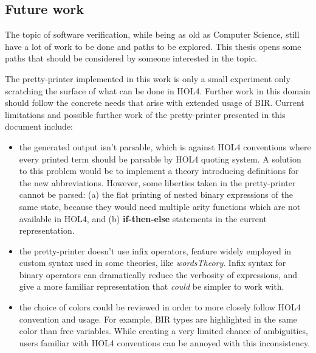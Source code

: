 \documentclass[10pt,a4paper]{article}
\begin{document}
\begin{multicols}{2}
\subsection{Future work}

The topic of software verification, while being as old as Computer Science, still have a lot of work to be done and paths to be explored. This thesis opens some paths that should be considered by someone interested in the topic.

The pretty-printer implemented in this work is only a small experiment only scratching the surface of what can be done in HOL4. Further work in this domain should follow the concrete needs that arise with extended usage of BIR. Current limitations and possible further work of the pretty-printer presented in this document include:

\begin{itemize}
    \item the generated output isn't parsable, which is against HOL4 conventions where every printed term should be parsable by HOL4 quoting system. A solution to this problem would be to implement a theory introducing definitions for the new abbreviations. However, some liberties taken in the pretty-printer cannot be parsed: (a) the flat printing of nested binary expressions of the same state, because they would need multiple arity functions which are not available in HOL4, and (b) \textbf{if-then-else} statements in the current representation.
    \item the pretty-printer doesn't use infix operators, feature widely employed in custom syntax used in some theories, like \textit{wordsTheory}. Infix syntax for binary operators can dramatically reduce the verbosity of expressions, and give a more familiar representation that \textit{could} be simpler to work with.
    \item the choice of colors could be reviewed in order to more closely follow HOL4 convention and usage. For example, BIR types are highlighted in the same color than free variables. While creating a very limited chance of ambiguities, users familiar with HOL4 conventions can be annoyed with this inconsistency.
\end{itemize}


\end{multicols}
\end{document}
